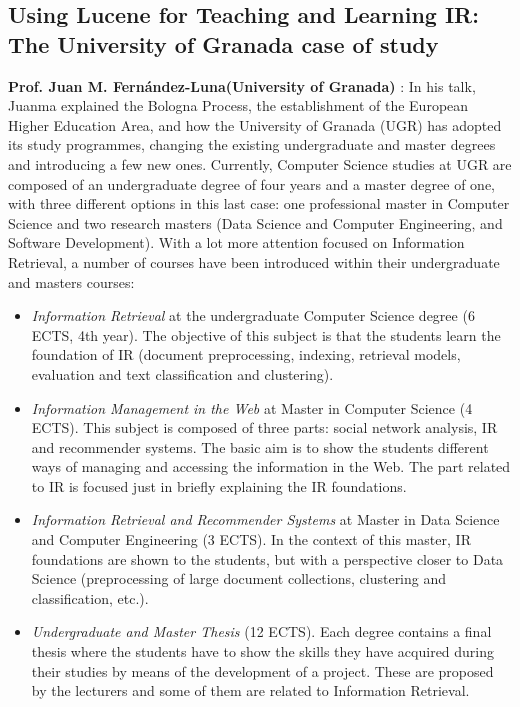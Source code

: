 
\subsection*{Using Lucene for Teaching and Learning IR: The University of Granada case of study} 

{\bf  Prof. Juan M. Fern\'andez-Luna(University of Granada) }: In his talk, Juanma explained the Bologna Process, the establishment of the European Higher Education Area, and how the University of Granada (UGR) has adopted its study programmes, changing the existing undergraduate and master degrees and introducing a few new ones. Currently, Computer Science studies at UGR are composed of an undergraduate degree of four years and a master degree of one, with three different options in this last case: one professional master in Computer Science and two research masters (Data Science and Computer Engineering, and Software Development). With a lot more attention focused on Information Retrieval, a number of courses have been introduced within their undergraduate and masters courses: 

\begin{itemize}
\item {\it Information Retrieval} at the undergraduate Computer Science degree (6 ECTS, 4th year).  The objective of this subject is that the students learn the foundation of IR (document preprocessing, indexing, retrieval models, evaluation and text classification and clustering).

\item {\it Information Management in the Web} at Master in Computer Science (4 ECTS). This subject is composed of three parts: social network analysis, IR and recommender systems. The basic aim is to show the students different ways of managing and accessing the information in the Web. The part related to IR is focused just in briefly explaining the IR foundations. 

\item {\it Information Retrieval and Recommender Systems} at Master in Data Science and Computer Engineering (3 ECTS). In the context of this master, IR foundations are shown to the students, but with a perspective closer to Data Science (preprocessing of large document collections, clustering and classification, etc.).

\item {\it Undergraduate and Master Thesis}  (12 ECTS). Each degree contains a final thesis where the students have to show the skills they have acquired during their studies by means of the development of a project. These are proposed by the lecturers and some of them are related to Information Retrieval.
\end{itemize}

